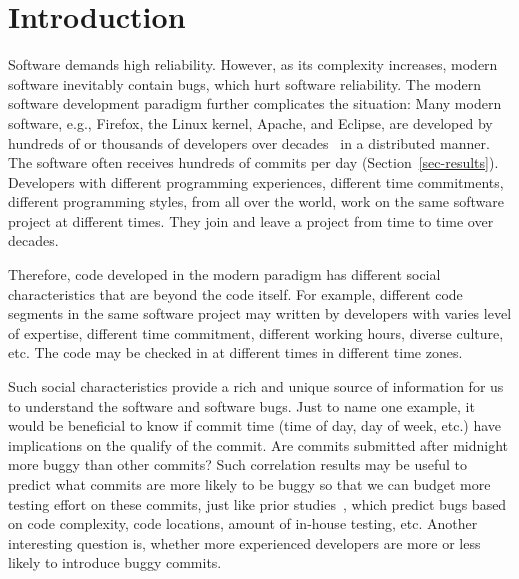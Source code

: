 \section{Introduction}


Software demands high reliability. However, as its complexity increases, 
modern software inevitably contain bugs, which hurt software reliability.
The modern software development paradigm further complicates the situation: 
Many modern software, e.g., Firefox, the Linux kernel, Apache, and Eclipse, 
are developed by hundreds of or thousands of developers over decades~\cite{ccomment} 
in a distributed manner. The software often receives hundreds of commits per day (Section~\ref{sec-results}). 
Developers with different programming experiences, 
different time commitments, different programming styles, from all over the world,
work on the same software project at different times. They join and leave a project 
from time to time over decades.

Therefore, code developed in the modern paradigm has different social characteristics 
that are beyond the code itself. For example, different code segments in the same
software project may written by developers with  
varies level of expertise, different time 
commitment, different working hours, diverse culture, etc.
The code may be checked in at different times in different time zones. 

Such social characteristics provide a rich and unique source of information for us to 
understand the software and software bugs. Just to name one example, it would be beneficial to know if  
commit time (time of day, day of week, etc.) have implications on the qualify of the commit. 
Are commits submitted after midnight more buggy than other commits? 
Such correlation results may be useful to predict what commits are more likely
to be buggy so that we can budget more testing effort on these commits, just
like prior studies~\cite{graves00predicting, guo04robust, ostrand05predicting},
which predict bugs based on code complexity, 
code locations, amount of in-house testing, etc. 
Another interesting question is, whether more experienced developers are more or less
likely to introduce buggy commits. 


